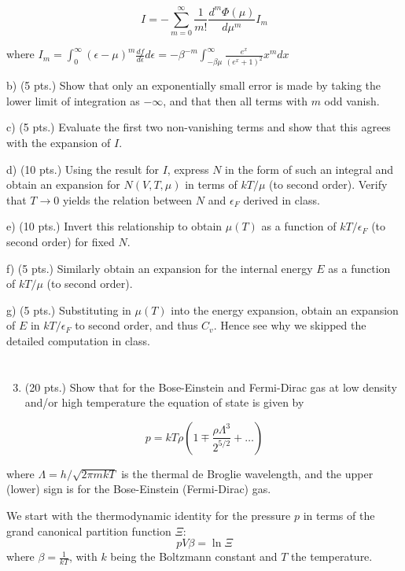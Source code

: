 \documentclass[12pt]{article}
\begin{document}
$$
I=-\sum_{m=0}^{\infty} \frac{1}{m !} \frac{d^{m} \Phi(\mu)}{d \mu^{m}} I_{m}
$$

where $I_{m}=\int_{0}^{\infty}(\epsilon-\mu)^{m} \frac{d f}{d \epsilon} d \epsilon=-\beta^{-m} \int_{-\beta \mu}^{\infty} \frac{e^{x}}{\left(e^{x}+1\right)^{2}} x^{m} d x$

b) (5 pts.) Show that only an exponentially small error is made by taking the lower limit of integration as $-\infty$, and that then all terms with $m$ odd vanish.

c) (5 pts.) Evaluate the first two non-vanishing terms and show that this agrees with the expansion of $I$.

d) (10 pts.) Using the result for $I$, express $N$ in the form of such an integral and obtain an expansion for $N(V, T, \mu)$ in terms of $k T / \mu$ (to second order). Verify that $T \rightarrow 0$ yields the relation between $N$ and $\epsilon_{F}$ derived in class.

e) (10 pts.) Invert this relationship to obtain $\mu(T)$ as a function of $k T / \epsilon_{F}$ (to second order) for fixed $N$.

f) (5 pts.) Similarly obtain an expansion for the internal energy $E$ as a function of $k T / \mu$ (to second order).

g) (5 pts.) Substituting in $\mu(T)$ into the energy expansion, obtain an expansion of $E$ in $k T / \epsilon_{F}$ to second order, and thus $C_{v}$. Hence see why we skipped the detailed computation in class.
\section{}
\begin{enumerate}
  \setcounter{enumi}{2}
  \item (20 pts.) Show that for the Bose-Einstein and Fermi-Dirac gas at low density and/or high temperature the equation of state is given by
\end{enumerate}

$$
p=k T \rho\left(1 \mp \frac{\rho \Lambda^{3}}{2^{5 / 2}}+\ldots\right)
$$

where $\Lambda=h / \sqrt{2 \pi m k T}$ is the thermal de Broglie wavelength, and the upper (lower) sign is for the Bose-Einstein (Fermi-Dirac) gas.

We start with the thermodynamic identity for the pressure $p$ in terms of the grand canonical partition function $\Xi$:
\begin{equation}
    pV\beta = \ln \Xi
\end{equation}
where $\beta = \frac{1}{kT}$, with $k$ being the Boltzmann constant and $T$ the temperature.
\end{document}
